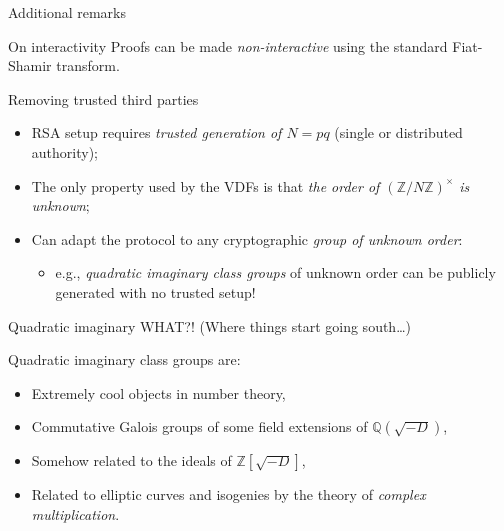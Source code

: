 \documentclass[aspectratio=169]{beamer}
\newcommand{\Z}{\mathbb{Z}}
\newcommand{\Q}{\mathbb{Q}}
\begin{document}

\begin{frame}[label=current]{Additional remarks}
  \begin{block}{On interactivity}
    Proofs can be made \emph{non-interactive} using the standard
    Fiat-Shamir transform.
  \end{block}

  \begin{block}{Removing trusted third parties}
    \begin{itemize}
    \item RSA setup requires \emph{trusted generation of $N=pq$}
      (single or distributed authority);
    \item The only property used by the VDFs is that \emph{the order
        of $(\Z/N\Z)^\times$ is unknown};
    \item Can adapt the protocol to any cryptographic \emph{group of
        unknown order}:
      \begin{itemize}
      \item e.g., \emph{quadratic imaginary class groups} of unknown
        order can be publicly generated with no trusted setup!
      \end{itemize}
    \end{itemize}
  \end{block}
\end{frame}


\begin{frame}[label=current]{Quadratic imaginary WHAT?! {\small(Where things start going south\dots)}}
  \large
  
  Quadratic imaginary class groups are:
  \begin{itemize}
  \item<+-> Extremely cool objects in number theory,
  \item<+-> Commutative Galois groups of some field extensions of
    \emph{$\Q(\sqrt{-D})$},
  \item<+-> Somehow related to the ideals of \emph{$\Z[\sqrt{-D}]$},
  \item<+-> Related to elliptic curves and isogenies by the theory of
    \emph{complex multiplication}.
  \end{itemize}
\end{frame}

\end{document}
